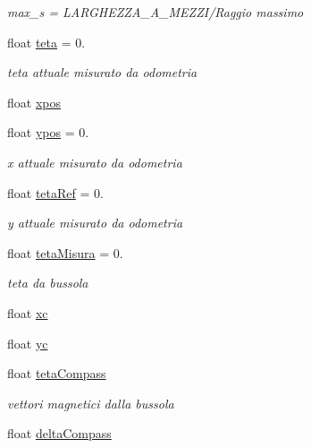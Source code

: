 \begin{DoxyCompactItemize}
\begin{DoxyCompactList}\small\item\em max\+\_\+s = L\+A\+R\+G\+H\+E\+Z\+Z\+A\+\_\+\+A\+\_\+\+M\+E\+Z\+Z\+I/\+Raggio massimo \end{DoxyCompactList}\item 
float \mbox{\hyperlink{ari_pi__2_d_c__esp__08_8ino_aa1cebdc383b21b594c09df4f1d035286}{teta}} = 0.
\begin{DoxyCompactList}\small\item\em teta attuale misurato da odometria \end{DoxyCompactList}\item 
float \mbox{\hyperlink{ari_pi__2_d_c__esp__08_8ino_adad239fcacf5c59997872bd0c12bdfd1}{xpos}}
\item 
float \mbox{\hyperlink{ari_pi__2_d_c__esp__08_8ino_adb369a2ec52b1f831cf362b570df40d2}{ypos}} = 0.
\begin{DoxyCompactList}\small\item\em x attuale misurato da odometria \end{DoxyCompactList}\item 
float \mbox{\hyperlink{ari_pi__2_d_c__esp__08_8ino_a75a4104f4a9f0fc17b53a88379ed7130}{teta\+Ref}} = 0.
\begin{DoxyCompactList}\small\item\em y attuale misurato da odometria \end{DoxyCompactList}\item 
float \mbox{\hyperlink{ari_pi__2_d_c__esp__08_8ino_ae26b39d3cd60fb721672915cdb90d756}{teta\+Misura}} = 0.
\begin{DoxyCompactList}\small\item\em teta da bussola \end{DoxyCompactList}\item 
float \mbox{\hyperlink{ari_pi__2_d_c__esp__08_8ino_a8c4da7cbc4b1a3cc91ebb8aeb7ecabbd}{xc}}
\item 
float \mbox{\hyperlink{ari_pi__2_d_c__esp__08_8ino_abc8f2957d7ee72cfb3e2af9bdfc27018}{yc}}
\item 
float \mbox{\hyperlink{ari_pi__2_d_c__esp__08_8ino_a87efb8e08c2adbc437cc67078d6a55fc}{teta\+Compass}}
\begin{DoxyCompactList}\small\item\em vettori magnetici dalla bussola \end{DoxyCompactList}\item 
float \mbox{\hyperlink{ari_pi__2_d_c__esp__08_8ino_affc72d7637b810bd21ce037f035b6e0a}{delta\+Compass}}

\end{DoxyCompactItemize}
